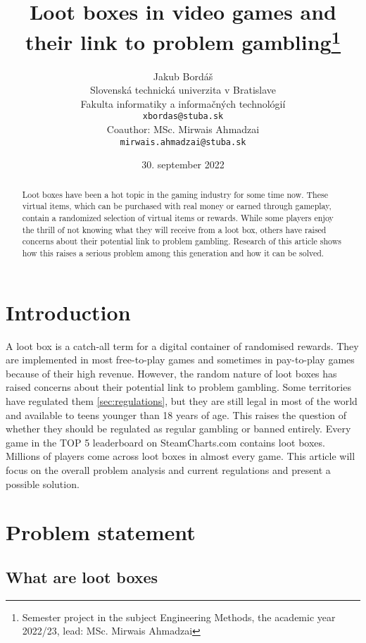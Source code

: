 \documentclass[10pt,oneside,english,a4paper]{article}
\title{Loot boxes in video games and their link to problem gambling\thanks{Semester project in the subject Engineering Methods, the academic year 2022/23, lead: MSc. Mirwais Ahmadzai}} %
\author{Jakub Bordáš\\[2pt]
	{\small Slovenská technická univerzita v Bratislave}\\
	{\small Fakulta informatiky a informačných technológií}\\
	{\small \texttt{xbordas@stuba.sk}}\\
	{\small Coauthor: MSc. Mirwais Ahmadzai}\\
	{\small \texttt{mirwais.ahmadzai@stuba.sk}}
	}
\date{\small 30. september 2022} %
\begin{document}
\maketitle

\begin{abstract}
Loot boxes have been a hot topic in the gaming industry for some time now. These virtual items, which can be purchased with real money or earned through gameplay, contain a randomized selection of virtual items or rewards. While some players enjoy the thrill of not knowing what they will receive from a loot box, others have raised concerns about their potential link to problem gambling. Research of this article shows how this raises a serious problem among this generation and how it can be solved.
\end{abstract}



\section{Introduction}

A loot box is a catch-all term for a digital container of randomised rewards. They are implemented in most free-to-play games and sometimes in pay-to-play games because of their high revenue. However, the random nature of loot boxes has raised concerns about their potential link to problem gambling.  Some territories have regulated them \ref{sec:regulations}, but they are still legal in most of the world and available to teens younger than 18 years of age. This raises the question of whether they should be regulated as regular gambling or banned entirely. Every game in the TOP 5 leaderboard on SteamCharts.com\cite{steamcharts} contains loot boxes. Millions of players\cite{springer:research} come across loot boxes in almost every game. This article will focus on the overall problem analysis and current regulations and present a possible solution.
\pagebreak


\section{Problem statement} \label{sec:problemstatement}

\subsection{What are loot boxes} \label{sec:what}
\end{document}
